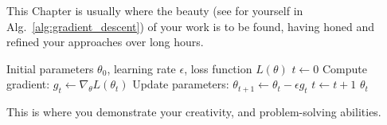This Chapter is usually where the beauty (see for yourself in Alg.~\ref{alg:gradient_descent}) of your work is to be found, having honed and refined your approaches over long hours. 


\begin{algorithm}[H]
  \caption{Pseudo-code for Gradient Descent Optimization. If this is not beautiful, I don't know what is.}
  \label{alg:gradient_descent}
  \begin{algorithmic}[1]
    \Require Initial parameters $\theta_0$, learning rate $\epsilon$, loss function $L(\theta)$
    \State $t \gets 0$
      \State Compute gradient: $g_t \gets \nabla_\theta L(\theta_t)$
      \State Update parameters: $\theta_{t+1} \gets \theta_t - \epsilon g_t$
      \State $t \gets t + 1$
    \EndWhile
    \Return $\theta_t$
  \end{algorithmic}
\end{algorithm}


This is where you demonstrate your creativity, and problem-solving abilities.



